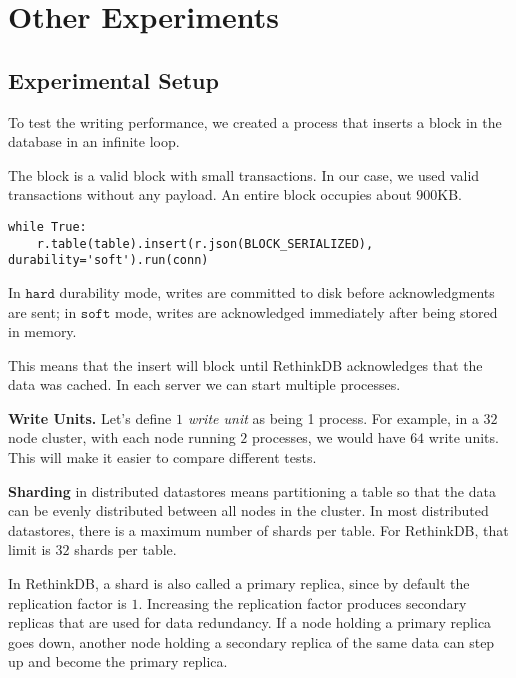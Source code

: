 \section{Other Experiments}\label{appendix:benchmarks}

\subsection{Experimental Setup}\label{subsec:benchmarks_setup}

To test the writing performance, we created a process that inserts a block in the database in an infinite loop.

The block is a valid block with small transactions.
In our case, we used valid transactions without any payload. 
An entire block occupies about $900$KB.

\begin{minipage}{\linewidth}
  \begin{lstlisting}[style=python]
  while True:
    r.table(table).insert(r.json(BLOCK_SERIALIZED), durability='soft').run(conn)\end{lstlisting}
\end{minipage}

In $\mathtt{hard}$ durability mode, writes are committed to disk before acknowledgments are sent; in $\mathtt{soft}$ mode, writes are acknowledged immediately after being stored in memory.

This means that the insert will block until RethinkDB acknowledges that the data was cached.
In each server we can start multiple processes.

\medskip
\noindent\textbf{Write Units.} Let’s define \textit{$1$ write unit} as being 1 process.
For example, in a $32$ node cluster, with each node running $2$ processes, we would have $64$ write units.
This will make it easier to compare different tests.

\medskip
\noindent\textbf{Sharding} in distributed datastores means partitioning a table so that the data can be evenly distributed between all nodes in the cluster.
In most distributed datastores, there is a maximum number of shards per table. For RethinkDB, that limit is $32$ shards per table.

In RethinkDB, a shard is also called a primary replica, since by default the replication factor is $1$.
Increasing the replication factor produces secondary replicas that are used for data redundancy. If a node holding a primary replica goes down, another node holding a secondary replica of the same data can step up and become the primary replica.

